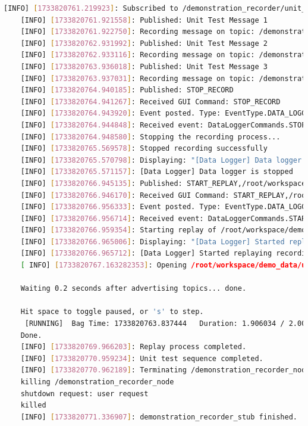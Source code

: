\documentclass{CSSRforAfrica}
\begin{document}
\begin{itemize}
\begin{lstlisting}[style=withoutNumbering, language=bash]
    [INFO] [1733820761.219923]: Subscribed to /demonstration_recorder/unit_test with queue size 1000
    [INFO] [1733820761.921558]: Published: Unit Test Message 1
    [INFO] [1733820761.922750]: Recording message on topic: /demonstration_recorder/unit_test
    [INFO] [1733820762.931992]: Published: Unit Test Message 2
    [INFO] [1733820762.933116]: Recording message on topic: /demonstration_recorder/unit_test
    [INFO] [1733820763.936018]: Published: Unit Test Message 3
    [INFO] [1733820763.937031]: Recording message on topic: /demonstration_recorder/unit_test
    [INFO] [1733820764.940185]: Published: STOP_RECORD
    [INFO] [1733820764.941267]: Received GUI Command: STOP_RECORD
    [INFO] [1733820764.943920]: Event posted. Type: EventType.DATA_LOGGING, Command: DataLoggerCommands.STOP_RECORD
    [INFO] [1733820764.944848]: Received event: DataLoggerCommands.STOP_RECORD
    [INFO] [1733820764.948580]: Stopping the recording process...
    [INFO] [1733820765.569578]: Stopped recording successfully
    [INFO] [1733820765.570798]: Displaying: "[Data Logger] Data logger is stopped"
    [INFO] [1733820765.571157]: [Data Logger] Data logger is stopped
    [INFO] [1733820766.945135]: Published: START_REPLAY,/root/workspace/demo_data/unit_test/demo_1_demonstration_recorder_unit_test.bag
    [INFO] [1733820766.946170]: Received GUI Command: START_REPLAY,/root/workspace/demo_data/unit_test/demo_1_demonstration_recorder_unit_test.bag
    [INFO] [1733820766.956333]: Event posted. Type: EventType.DATA_LOGGING, Command: DataLoggerCommands.START_REPLAY
    [INFO] [1733820766.956714]: Received event: DataLoggerCommands.START_REPLAY
    [INFO] [1733820766.959354]: Starting replay of /root/workspace/demo_data/unit_test/demo_1_demonstration_recorder_unit_test.bag
    [INFO] [1733820766.965006]: Displaying: "[Data Logger] Started replaying recording: /root/workspace/demo_data/unit_test/demo_1_demonstration_recorder_unit_test.bag"
    [INFO] [1733820766.965712]: [Data Logger] Started replaying recording: /root/workspace/demo_data/unit_test/demo_1_demonstration_recorder_unit_test.bag
    [ INFO] [1733820767.163282353]: Opening /root/workspace/demo_data/unit_test/demo_1_demonstration_recorder_unit_test.bag
    
    Waiting 0.2 seconds after advertising topics... done.
    
    Hit space to toggle paused, or 's' to step.
     [RUNNING]  Bag Time: 1733820763.837444   Duration: 1.906034 / 2.008535               
    Done.
    [INFO] [1733820769.966203]: Replay process completed.
    [INFO] [1733820770.959234]: Unit test sequence completed.
    [INFO] [1733820770.962189]: Terminating /demonstration_recorder_node...
    killing /demonstration_recorder_node
    shutdown request: user request
    killed
    [INFO] [1733820771.336907]: demonstration_recorder_stub finished.
    \end{lstlisting}   
\end{itemize}
\end{document}
